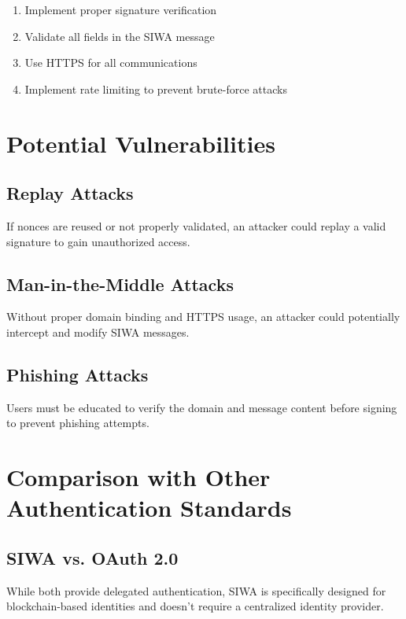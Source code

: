 \documentclass[12pt, a4paper, twocolumn]{article}
\begin{document}
\begin{enumerate}
  \item Implement proper signature verification
  \item Validate all fields in the SIWA message
  \item Use HTTPS for all communications
  \item Implement rate limiting to prevent brute-force attacks
\end{enumerate}

\section{Potential Vulnerabilities}

\subsection{Replay Attacks}

If nonces are reused or not properly validated, an attacker could replay a valid signature to gain unauthorized access.

\subsection{Man-in-the-Middle Attacks}

Without proper domain binding and HTTPS usage, an attacker could potentially intercept and modify SIWA messages.

\subsection{Phishing Attacks}

Users must be educated to verify the domain and message content before signing to prevent phishing attempts.

\section{Comparison with Other Authentication Standards}

\subsection{SIWA vs. OAuth 2.0}

While both provide delegated authentication, SIWA is specifically designed for blockchain-based identities and doesn't require a centralized identity provider.
\end{document}
